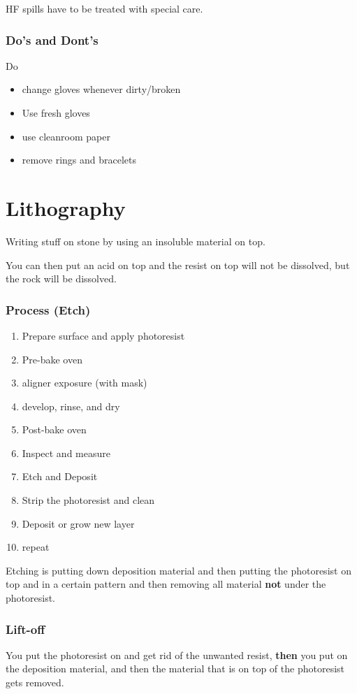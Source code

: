 \documentclass[fleqn]{report}
\begin{document}
HF spills have to be treated with special care.

\subsection{Do's and Dont's}
Do 
\begin{itemize}
    \item 
    change gloves whenever dirty/broken
    \item 
    Use fresh gloves
    \item 
    use cleanroom paper
    \item 
    remove rings and bracelets
\end{itemize}

\chapter{Lithography}
Writing stuff on stone by using an insoluble material on top. 

You can then put an acid on top and the resist on top will not be dissolved, 
but the rock will be dissolved.

\subsection{Process (Etch)}
\begin{enumerate}
    \item 
    Prepare surface and apply photoresist 
    \item 
    Pre-bake oven 
    \item 
    aligner exposure (with mask)
    \item 
    develop, rinse, and dry 
    \item 
    Post-bake oven
    \item 
    Inspect and measure
    \item 
    Etch and Deposit
    \item 
    Strip the photoresist and clean 
    \item 
    Deposit or grow new layer 
    \item 
    repeat 
\end{enumerate}

Etching is putting down deposition material and then putting the photoresist 
on top and in a certain pattern and then removing all material \textbf{not}
under the photoresist.

\subsection{Lift-off}
You put the photoresist on and get rid of the unwanted resist, 
\textbf{then} you put on the deposition material, and then the material that 
is on top of the photoresist gets removed.
\end{document}
